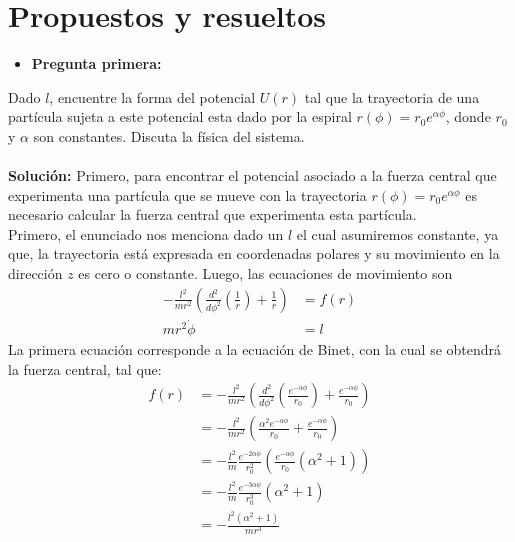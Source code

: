 \documentclass[../main.tex]{subfiles}
\begin{document}

\section{Propuestos y resueltos}


\begin{itemize}
    \item \textbf{Pregunta primera:}
\end{itemize}

 Dado $l$, encuentre la forma del potencial $U(r)$ tal que la trayectoria de una partícula sujeta a este potencial esta dado por la espiral $r(\phi)=r_0e^{\alpha \phi}$, donde $r_0$ y $\alpha$ son constantes. Discuta la física del sistema. \\
\\
\textbf{Solución:} Primero, para encontrar el potencial asociado a la fuerza central que experimenta una partícula que se mueve con la trayectoria $r(\phi)=r_0e^{\alpha \phi}$ es necesario calcular la fuerza central que experimenta esta partícula. 
\\
Primero, el enunciado nos menciona dado un $l$ el cual asumiremos constante, ya que, la trayectoria está expresada en coordenadas polares y su movimiento en la dirección $z$ es cero o constante. Luego, las ecuaciones de movimiento son
\begin{align}
    -\frac{l^2}{mr^2} \left( \frac{d^2}{d \phi^2}\left( \frac{1}{r}\right)+\frac{1}{r} \right) & =f(r) \\ 
    mr^2\dot{\phi} & =l  
\end{align}
La primera ecuación corresponde a la ecuación de Binet, con la cual se obtendrá la fuerza central, tal que:
\begin{align*}
    f(r) & =  -\frac{l^2}{mr^2} \left( \frac{d^2}{d \phi^2}\left( \frac{e^{-\alpha\phi}}{r_0}\right)+\frac{e^{-\alpha\phi}}{r_0} \right) \\
    & = -\frac{l^2}{mr^2} \left( \frac{\alpha^2e^{-\alpha\phi}}{r_0} + \frac{e^{-\alpha \phi}}{r_0} \right) \\
    & =  -\frac{l^2}{m} \frac{e^{-2\alpha \phi}}{r_0^2} \left( \frac{e^{-\alpha \phi}}{r_0}\left(\alpha^2+1 \right)  \right) \\
    & = -\frac{l^2}{m} \frac{e^{-3\alpha \phi}}{r_0^3}\left(\alpha^2 +1\right) \\
    & = -\frac{l^2(\alpha^2+1)}{m r^3}
\end{align*}
\end{document}
